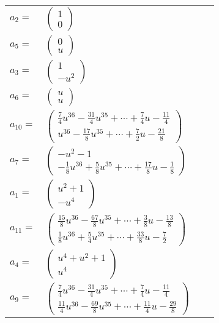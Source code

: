 \documentclass[1p]{elsarticle_modified}
\theoremstyle{definition}
\begin{document}
\begin{tabular}{m{7pt} m{180pt} m{7pt} m{180pt} }
\flushright $a_{2}=$&$\begin{pmatrix}1\\0\end{pmatrix}$ \\
\flushright $a_{5}=$&$\begin{pmatrix}0\\u\end{pmatrix}$ \\
\flushright $a_{3}=$&$\begin{pmatrix}1\\- u^2\end{pmatrix}$ \\
\flushright $a_{6}=$&$\begin{pmatrix}u\\u\end{pmatrix}$ \\
\flushright $a_{10}=$&$\begin{pmatrix}\frac{7}{4} u^{36}-\frac{31}{4} u^{35}+\cdots+\frac{7}{4} u-\frac{11}{4}\\u^{36}-\frac{17}{8} u^{35}+\cdots+\frac{7}{2} u-\frac{21}{8}\end{pmatrix}$ \\
\flushright $a_{7}=$&$\begin{pmatrix}- u^2-1\\-\frac{1}{8} u^{36}+\frac{5}{8} u^{35}+\cdots+\frac{17}{8} u-\frac{1}{8}\end{pmatrix}$ \\
\flushright $a_{1}=$&$\begin{pmatrix}u^2+1\\- u^4\end{pmatrix}$ \\
\flushright $a_{11}=$&$\begin{pmatrix}\frac{15}{8} u^{36}-\frac{67}{8} u^{35}+\cdots+\frac{3}{8} u-\frac{13}{8}\\\frac{1}{8} u^{36}+\frac{5}{4} u^{35}+\cdots+\frac{33}{8} u-\frac{7}{2}\end{pmatrix}$ \\
\flushright $a_{4}=$&$\begin{pmatrix}u^4+u^2+1\\u^4\end{pmatrix}$ \\
\flushright $a_{9}=$&$\begin{pmatrix}\frac{7}{4} u^{36}-\frac{31}{4} u^{35}+\cdots+\frac{7}{4} u-\frac{11}{4}\\\frac{11}{4} u^{36}-\frac{69}{8} u^{35}+\cdots+\frac{11}{4} u-\frac{29}{8}\end{pmatrix}$ \\

\end{tabular}
\end{document}
